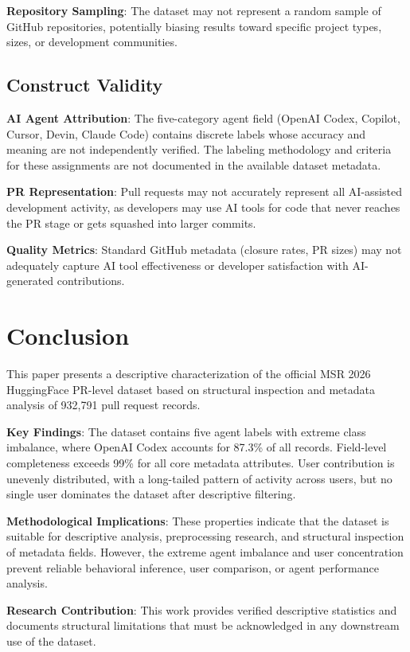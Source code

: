 \documentclass[conference]{IEEEtran}
\begin{document}
\textbf{Repository Sampling}: The dataset may not represent a random sample of GitHub repositories, potentially biasing results toward specific project types, sizes, or development communities.

\subsection{Construct Validity}

\textbf{AI Agent Attribution}: The five-category agent field (OpenAI Codex, Copilot, Cursor, Devin, Claude Code) contains discrete labels whose accuracy and meaning are not independently verified. The labeling methodology and criteria for these assignments are not documented in the available dataset metadata.

\textbf{PR Representation}: Pull requests may not accurately represent all AI-assisted development activity, as developers may use AI tools for code that never reaches the PR stage or gets squashed into larger commits.

\textbf{Quality Metrics}: Standard GitHub metadata (closure rates, PR sizes) may not adequately capture AI tool effectiveness or developer satisfaction with AI-generated contributions.

\section{Conclusion}

This paper presents a descriptive characterization of the official MSR 2026 HuggingFace PR-level dataset based on structural inspection and metadata analysis of 932,791 pull request records.

\textbf{Key Findings}: The dataset contains five agent labels with extreme class imbalance, where OpenAI Codex accounts for 87.3\% of all records. Field-level completeness exceeds 99\% for all core metadata attributes. User contribution is unevenly distributed, with a long-tailed pattern of activity across users, but no single user dominates the dataset after descriptive filtering.

\textbf{Methodological Implications}: These properties indicate that the dataset is suitable for descriptive analysis, preprocessing research, and structural inspection of metadata fields. However, the extreme agent imbalance and user concentration prevent reliable behavioral inference, user comparison, or agent performance analysis.

\textbf{Research Contribution}: This work provides verified descriptive statistics and documents structural limitations that must be acknowledged in any downstream use of the dataset.
\end{document}
